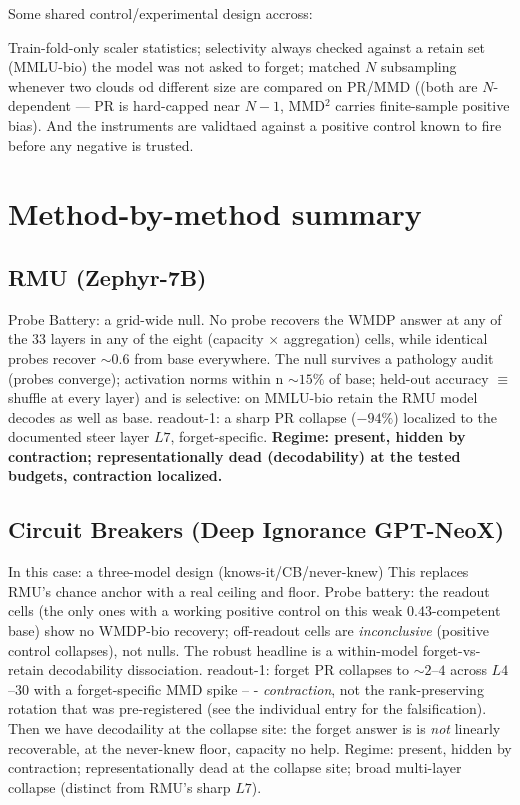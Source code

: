 \documentclass[11pt]{article}
\newcommand{\PR}{\mathrm{PR}}
\begin{document}
Some shared control/experimental design accross: 

Train-fold-only scaler statistics; selectivity always checked against a retain set (MMLU-bio) the model was not asked to forget; matched $N$ subsampling whenever two clouds od different size are compared on PR/MMD ((both are
$N$-dependent --- PR is hard-capped near $N{-}1$, MMD$^2$ carries finite-sample positive
bias). And the instruments are validtaed against a positive control known to fire before any negative is trusted. 

\section{Method-by-method summary}
\subsection{RMU (Zephyr-7B)}
Probe Battery: a grid-wide null. No probe recovers the WMDP answer at any of the 33 layers in any of the eight (capacity $\times$ aggregation) cells, while identical probes recover $\sim\!0.6$ from base everywhere. The null survives a pathology audit (probes converge); activation norms within n $\sim\!15\%$ of base; held-out accuracy
$\equiv$ shuffle at every layer) and is selective: on MMLU-bio retain the RMU model decodes
as well as base. readout-1: a sharp $\PR$ collapse ($-94\%$) localized to the documented
steer layer $L7$, forget-specific. \textbf{Regime: present, hidden by contraction;
representationally dead (decodability) at the tested budgets, contraction localized.}


\subsection{Circuit Breakers (Deep Ignorance GPT-NeoX)}
In this case: a three-model design (knows-it/CB/never-knew) 
This replaces RMU's chance anchor with a real ceiling and floor. Probe battery:  the readout cells (the only ones with a working positive
control on this weak $0.43$-competent base) show no WMDP-bio recovery; off-readout cells
are \emph{inconclusive} (positive control collapses), not nulls. The robust headline is a
within-model forget-vs-retain decodability dissociation. readout-1: forget $\PR$ collapses
to $\sim\!2$--$4$ across $L4$--$30$ with a forget-specific MMD spike -- - \emph{contraction},
not the rank-preserving rotation that was pre-registered (see the individual entry for the
falsification). Then we have decodaility at the collapse site: the forget answer is  is \emph{not} linearly
recoverable, at the never-knew floor, capacity no help. Regime: present, hidden by
contraction; representationally dead at the collapse site; broad multi-layer collapse
(distinct from RMU's sharp $L7$).
\end{document}
